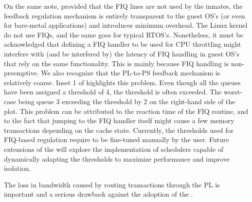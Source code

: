 {  On the same note, provided that the FIQ lines are not used by the
  inmates, the feedback regulation mechanism is entirely transparent
  to the guest OS's (or even for bare-metal applications) and
  introduces minimum overhead. The Linux kernel do not use FIQs, and
  the same goes for typical RTOS's. Nonetheless, it must be
  acknowledged that defining a FIQ handler to be used for CPU
  throttling might interfere with (and be interfered by) the latency
  of FIQ handling in guest OS's that rely on the same
  functionality. This is mainly because FIQ handling is
  non-preemptive. We also recognize that the PL-to-PS feedback
  mechanism is relatively coarse. Inset 1 of
   highlights this problem. Even
  though all the queues have been assigned a threshold of 4, the
  threshold is often exceeded.  The worst-case being queue 3 exceeding
  the threshold by 2 on the right-hand side of the plot. This problem
  can be attributed to the reaction time of the FIQ routine, and to
  the fact that jumping to the FIQ handler itself might cause a few
  memory transactions depending on the cache state. Currently, the
  thresholds used for FIQ-based regulation require to be fine-tuned
  manually by the user. Future extensions of the \schim will explore
  the implementation of schedulers capable of dynamically adapting the
  thresholds to maximize performance and improve isolation.

  The loss in bandwidth caused by routing transactions through the PL
  is important and a serious drawback against the adoption of the
  \schim.}
